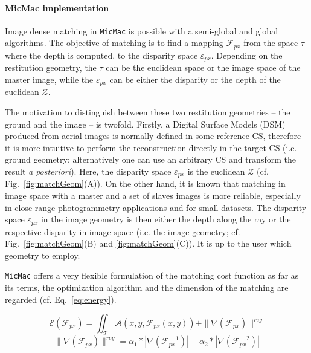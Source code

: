 \documentclass[twocolumn]{bmcart}%
\newcommand{\Energ}{\ensuremath{{\mathcal E}}}
\newcommand{\Ress}{\ensuremath{{\mathcal A}}}
\newcommand{\FPx}{\ensuremath{{\mathcal F}_{px}}}
\newcommand{\ETer}{\ensuremath {\mathcal T}}
\begin{document}
\paragraph*{MicMac implementation}
%
Image dense matching in {\tt MicMac} is possible with a semi-global and global algorithms. The objective of matching is to find a mapping $\mathcal{F}_{px}$ from the space $\tau$ where the depth is computed, to the disparity space $\varepsilon_{px}$. Depending on the restitution geometry, the $\tau$ can be the euclidean space or the image space of the master image, while the $\varepsilon_{px}$ can be either the disparity or the depth of the euclidean $\mathcal{Z}$.\par  
%
The motivation to distinguish between these two restitution geometries -- the ground and the image -- is twofold. Firstly, a Digital Surface Models (DSM) produced from aerial images is normally defined in some reference CS, therefore it is more intuitive to perform the reconstruction directly in the target CS (i.e. ground geometry; alternatively one can use an arbitrary CS and transform the result \textit{a posteriori}). Here, the disparity space $\varepsilon_{px}$ is the euclidean $\mathcal{Z}$ (cf. Fig.~\ref{fig:matchGeom}(A)). 
On the other hand, it is known that matching in image space with a master and a set of slaves images is more reliable, especially in close-range photogrammetry applications and for small datasets. The disparity space $\varepsilon_{px}$ in the image geometry is then either the depth along the ray or the respective disparity in image space (i.e. the image geometry; cf. Fig.~\ref{fig:matchGeom}(B) and \ref{fig:matchGeom}(C)). It is up to the user which geometry to employ.
\par
%
{\tt MicMac} offers a very flexible formulation of the matching cost function as far as its terms, the optimization algorithm and the dimension of the matching are regarded (cf. Eq.~\ref{eq:energy}).   


\begin{equation}
\label{eq:energy}
   \Energ(\FPx) = \iint_\ETer \Ress(x,y,\FPx(x,y)) + \| \nabla(\FPx) \|^{reg}
\end{equation}
\begin{equation}
\label{eq:energySmoothTerm}
   \| \nabla(\FPx) \|^{reg} = \alpha_1*|\nabla(\FPx^1)|+\alpha_2*|\nabla(\FPx^2)|
\end{equation}
\end{document}
